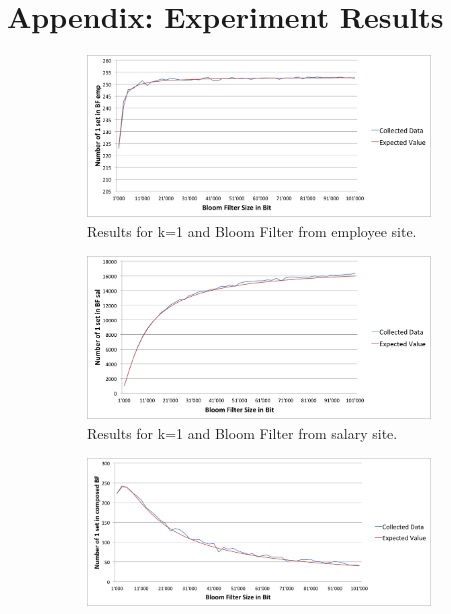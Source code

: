 \documentclass[12]{scrartcl}
\begin{document}



\appendix

\section{Appendix: Experiment Results}
\begin{figure}[H]
	\begin{subfigure}[t]{\textwidth}
		\begin{center}
			\includegraphics[scale=0.3]{res/1-emp.png}
		\end{center}
		\caption{Results for k=1 and Bloom Filter from employee site.}
	\end{subfigure}
	\begin{subfigure}[t]{\textwidth}
		\begin{center}
			\includegraphics[scale=0.3]{res/1-sal.png}
		\end{center}
		\caption{Results for k=1 and Bloom Filter from salary site.}
	\end{subfigure}
	\begin{subfigure}[t]{\textwidth}
		\begin{center}
			\includegraphics[scale=0.3]{res/1-composed.png}

\end{center}
\end{subfigure}
\end{figure}
\end{document}
